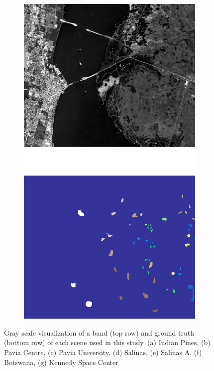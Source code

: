 \documentclass[remotesensing,article,submit,moreauthors,pdftex]{Definitions/mdpi}
\begin{document}
\begin{figure}[H]
\begin{subfigure}{.24\textwidth}
		\includegraphics[height=1.5\linewidth]{../analysis/kennedy_space_center}
		\subcaption{{\medbreak}}\label{fig:kennedy_space_center}
	\end{subfigure}
	\caption{Gray scale visualization of a band (top row) and ground truth (bottom row) of
		each scene used in this study. (a) Indian Pines, (b) Pavia Centre, (c) Pavia
		University, (d) Salinas, (e) Salinas A, (f) Botswana, (g) Kennedy Space Center
    }\label{fig:scenes}
\end{figure}
\end{document}
